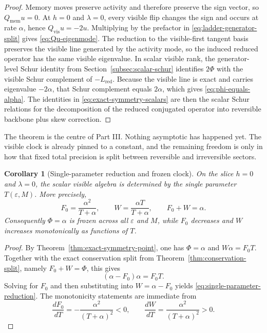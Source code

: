 \documentclass[11pt]{article}
\numberwithin{equation}{section}
\newcommand{\eps}{\varepsilon}
\theoremstyle{thmcompact}
\newtheorem{corollary}[theorem]{Corollary}
\theoremstyle{remark}
\begin{document}
\begin{proof}
Memory moves preserve activity and therefore preserve the sign vector, so $Q_{\mathrm{mem}}u=0$. At $h=0$ and $\lambda=0$, every visible flip changes the sign and occurs at rate $\alpha$, hence $Q_{\mathrm{vis}}u=-2u$. Multiplying by the prefactor in \eqref{eq:ladder-generator-split} gives \eqref{eq:Qu-eigenmode}. The reduction to the visible-first tangent basis preserves the visible line generated by the activity mode, so the induced reduced operator has the same visible eigenvalue. In scalar visible rank, the generator-level Schur identity from Section~\ref{subsec:scalar-schur} identifies $2\Phi$ with the visible Schur complement of $-L_{\mathrm{red}}$. Because the visible line is exact and carries eigenvalue $-2\alpha$, that Schur complement equals $2\alpha$, which gives \eqref{eq:phi-equals-alpha}. The identities in \eqref{eq:exact-symmetry-scalars} are then the scalar Schur relations for the decomposition of the reduced conjugated operator into reversible backbone plus skew correction.
\end{proof}

The theorem is the centre of Part III. Nothing asymptotic has happened yet. The visible clock is already pinned to a constant, and the remaining freedom is only in how that fixed total precision is split between reversible and irreversible sectors.

\begin{corollary}[Single-parameter reduction and frozen clock]\label{cor:single-parameter-reduction}
On the slice $h=0$ and $\lambda=0$, the scalar visible algebra is determined by the single parameter $T(\eps,M)$. More precisely,
\begin{equation}\label{eq:single-parameter-reduction}
F_0 = \frac{\alpha^2}{T+\alpha},
\qquad
W = \frac{\alpha T}{T+\alpha},
\qquad
F_0 + W = \alpha.
\end{equation}
Consequently $\Phi=\alpha$ is frozen across all $\eps$ and $M$, while $F_0$ decreases and $W$ increases monotonically as functions of $T$.
\end{corollary}

\begin{proof}
By Theorem~\ref{thm:exact-symmetry-point}, one has $\Phi=\alpha$ and $W\alpha=F_0T$. Together with the exact conservation split from Theorem~\ref{thm:conservation-split}, namely $F_0+W=\Phi$, this gives
\[
(\alpha-F_0)\alpha = F_0T.
\]
Solving for $F_0$ and then substituting into $W=\alpha-F_0$ yields \eqref{eq:single-parameter-reduction}. The monotonicity statements are immediate from
\[
\frac{dF_0}{dT} = -\frac{\alpha^2}{(T+\alpha)^2} < 0,
\qquad
\frac{dW}{dT} = \frac{\alpha^2}{(T+\alpha)^2} > 0.
\]
\end{proof}
\end{document}
